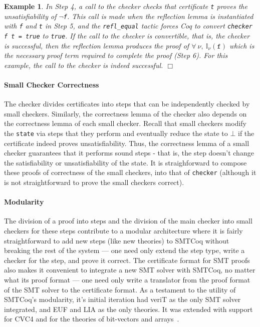 \documentclass[11pt]{article}
\newtheorem{example}{Example}[section]
\newcommand{\intr}[1]{\mathbb{I}_{\nu}(#1)}
\begin{document}
\begin{example}
		In Step 4, a call to the checker 
		checks that certificate \texttt{t} 
		proves the unsatisfiability of 
		\texttt{$\neg$f}. This call is made
		when the reflection lemma 
		is instantiated with \texttt{f} and 
		\texttt{t} in Step 5, and the 
		\texttt{refl\_equal} tactic forces 
		Coq to convert 
		\texttt{checker f t = true} to 
		\texttt{true}. If the call to the 
		checker is convertible, that is,
		the checker is successful, then 
		the reflection lemma produces 
		the proof of 
		$\forall\ \nu,\ \intr{\texttt{f}}$
		which is the necessary proof term 
		required to complete the proof 
		(Step 6). For 
		this example, the call to the 
		checker is indeed successful.
		\hfill $\Box$
	\end{example}

	\paragraph{Small Checker Correctness}
	The checker divides certificates
	into steps that can be independently 
	checked by small checkers.
	Similarly, the correctness lemma
	of the checker also depends on 
	the correctness lemma of each 
	small checker. Recall that 
	small checkers modify the 
	\texttt{state} via steps that 
	they perform and eventually
	reduce the state to $\bot$ if 
	the certificate indeed proves
	unsatisfiability.  Thus, the 
	correctness lemma of a small 
	checker guarantees that it
	performs sound steps - that is,
	the step doesn't change the 
	satisfiability or unsatisfiability
	of the state. It is straighforward
	to compose these proofs 
	of correctness of the small 
	checkers, into that of
	\texttt{checker} (although
	it is not straightforward 
	to prove the small checkers 
	correct). 
	
	\paragraph{Modularity} The division 
	of a proof into steps and 
	the division of the main 
	checker into small checkers for these
	steps contribute to a 
	modular architecture where it 
	is fairly straightforward to 
	add new steps (like new theories)
	to SMTCoq without breaking 
	the rest of the system --- one 
	need only extend the step type,
	write a checker for the step, 
	and prove it correct. The 
	certificate format for SMT
	proofs also makes it 
	convenient to integrate a 
	new SMT solver with SMTCoq, 
	no matter what its proof format
	--- one need only write a translator
	from the proof format of the SMT
	solver to the certificate format. 
	As a testament to the utility of
	SMTCoq's modularity, it's 
	initial iteration had veriT as 
	the only SMT solver integrated, 
	and EUF and LIA as the only 
	theories. It was extended 
	with support for CVC4 and 
	for the theories of 
	bit-vectors and 
	arrays~\cite{DBLP:journals/corr/EkiciKKMRT16}.
	
\end{document}
